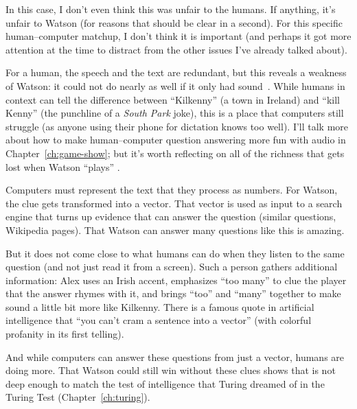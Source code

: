 In this case, I don't even think this was unfair to the humans.
%
If anything, it's unfair to Watson (for reasons that should be clear
in a second).
%
For this specific human--computer matchup, I don't think it is
important (and perhaps it got more attention at the time to distract from the
other issues I've already talked about).

For a human, the speech and the text are redundant, but this reveals a
weakness of Watson: it could not do nearly as well if it only had
sound~\citep{Peskov-19}.
%
While humans in context can tell the difference between ``Kilkenny'' (a town in
Ireland) and ``kill Kenny'' (the punchline of a \textit{South Park}
joke), this is a place that computers still struggle (as anyone using
their phone for dictation knows too well).
%
I'll talk more about how to make human--computer question answering
more fun with audio in Chapter~\ref{ch:game-show}; but it's worth
reflecting on all of the richness that gets lost when Watson ``plays''
\jeopardyp{}.

Computers must represent the text that they process as numbers.
%
For Watson, the clue  gets transformed into a
vector.
%
That vector is used as input to a search engine that turns up evidence
that can answer the question (similar questions, Wikipedia pages).
%
That Watson can answer many questions like this is amazing.


But it does not come close to what humans can do when they listen to
the same question (and not just read it from a screen).
% 
Such a person gathers additional
information: Alex uses an Irish accent, emphasizes ``too many'' to
clue the player that the answer rhymes with it, and brings ``too'' and
``many'' together to make sound a little bit more like Kilkenny.
%
There is a famous quote in artificial intelligence that ``you can't
cram a sentence into a vector'' (with colorful profanity in its first
telling).

And while computers can answer these questions from just a vector,
humans are doing more.
%
That Watson could still win without these clues shows that \jeopardy{}
is not deep enough to match the test of intelligence that Turing
dreamed of in the Turing Test (Chapter~\ref{ch:turing}).
